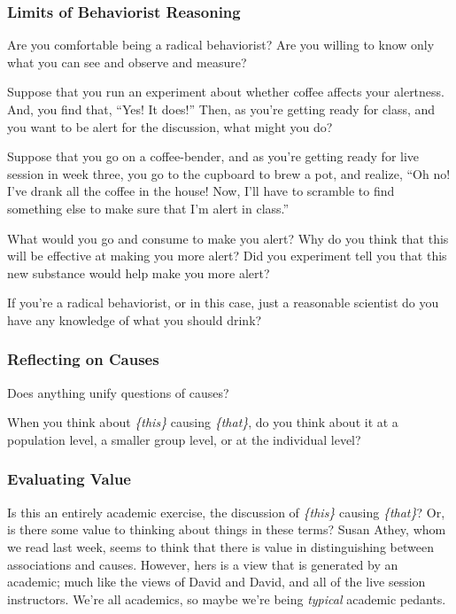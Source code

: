 \documentclass[
]{article}
\theoremstyle{definition}
\theoremstyle{definition}
\theoremstyle{definition}
\theoremstyle{definition}
\theoremstyle{remark}
\begin{document}
\subsubsection{Limits of Behaviorist Reasoning}\label{limits-of-behaviorist-reasoning}

Are you comfortable being a radical behaviorist? Are you willing to know only what you can see and observe and measure?

Suppose that you run an experiment about whether coffee affects your alertness. And, you find that, ``Yes! It does!'' Then, as you're getting ready for class, and you want to be alert for the discussion, what might you do?

Suppose that you go on a coffee-bender, and as you're getting ready for live session in week three, you go to the cupboard to brew a pot, and realize, ``Oh no! I've drank all the coffee in the house! Now, I'll have to scramble to find something else to make sure that I'm alert in class.''

What would you go and consume to make you alert? Why do you think that this will be effective at making you more alert? Did you experiment tell you that this new substance would help make you more alert?

If you're a radical behaviorist, or in this case, just a reasonable scientist do you have any knowledge of what you should drink?

\subsubsection{Reflecting on Causes}\label{reflecting-on-causes}

Does anything unify questions of causes?

When you think about \emph{\{this\}} causing \emph{\{that\}}, do you think about it at a population level, a smaller group level, or at the individual level?

\subsubsection{Evaluating Value}\label{evaluating-value}

Is this an entirely academic exercise, the discussion of \emph{\{this\}} causing \emph{\{that\}}? Or, is there some value to thinking about things in these terms? Susan Athey, whom we read last week, seems to think that there is value in distinguishing between associations and causes. However, hers is a view that is generated by an academic; much like the views of David and David, and all of the live session instructors. We're all academics, so maybe we're being \emph{typical} academic pedants.
\end{document}
